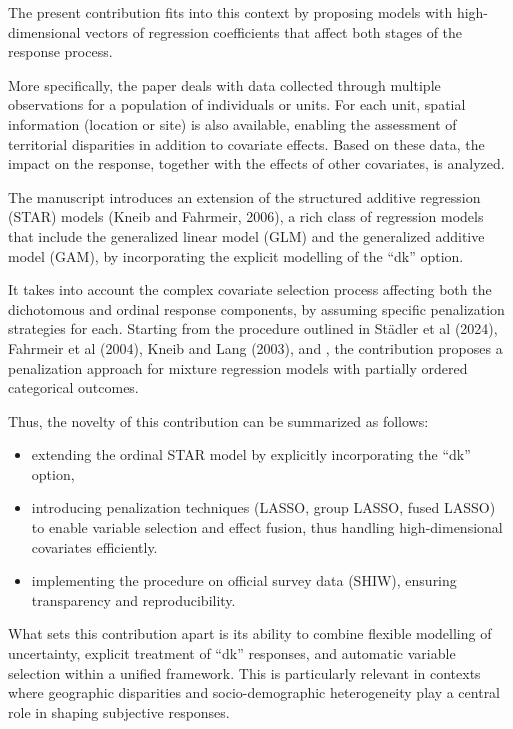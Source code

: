 \documentclass[submit]{smj}
\begin{document}
The present contribution fits into this context by proposing models with high-dimensional vectors of regression coefficients that affect both stages of the response process. 

More specifically, the paper deals with data collected through multiple observations for a population of individuals or units. For each unit, spatial information (location or site) is also available, enabling the assessment of territorial disparities in addition to covariate effects. Based on these data, the impact on the response, together with the effects of other covariates, is analyzed.

The manuscript introduces an extension of the structured additive regression (STAR) models (Kneib and Fahrmeir, 2006), a rich class of regression models that include the generalized linear model (GLM) and the generalized additive model (GAM), by incorporating the explicit modelling of the  \enquote{dk}  option.

It takes into account the complex covariate selection process affecting both the dichotomous and ordinal response components, by assuming specific penalization strategies for each. 
Starting from the procedure outlined in St\"adler et al (2024),  Fahrmeir et al (2004), Kneib and Lang (2003), and \cite{GroHaKneUm:2019}, the contribution proposes
a penalization approach for mixture regression models with partially ordered categorical outcomes.

Thus, the novelty of this contribution can be summarized as follows: 
\begin{itemize}
  \item extending the ordinal STAR model by explicitly incorporating the \enquote{dk} option,
  \item introducing penalization techniques
    (LASSO, group LASSO, fused LASSO) to enable variable selection and effect fusion, thus handling high-dimensional covariates efficiently.
  \item implementing the procedure on official survey data (SHIW), ensuring transparency and reproducibility. %
\end{itemize}

What sets this contribution apart is its ability to combine flexible modelling of uncertainty, explicit treatment of \enquote{dk} responses, and automatic variable selection within a unified framework. This is particularly relevant in contexts where geographic disparities and socio-demographic heterogeneity play a central role in shaping subjective responses.
\end{document}
